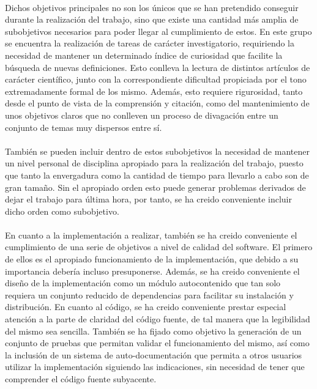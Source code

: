 \documentclass{subfiles}
\begin{document}
      \paragraph{}
      Dichos objetivos principales no son los únicos que se han pretendido conseguir durante la realización del trabajo, sino que existe una cantidad más amplia de subobjetivos necesarios para poder llegar al cumplimiento de estos. En este grupo se encuentra la realización de tareas de carácter investigatorio, requiriendo la necesidad de mantener un determinado índice de curiosidad que facilite la búsqueda de nuevas definiciones. Esto conlleva la lectura de distintos artículos de carácter científico, junto con la correspondiente dificultad propiciada por el tono extremadamente formal de los mismo. Además, esto requiere rigurosidad, tanto desde el punto de vista de la comprensión y citación, como del mantenimiento de unos objetivos claros que no conlleven un proceso de divagación entre un conjunto de temas muy dispersos entre sí.

      \paragraph{}
      También se pueden incluir dentro de estos subobjetivos la necesidad de mantener un nivel personal de disciplina apropiado para la realización del trabajo, puesto que tanto la envergadura como la cantidad de tiempo para llevarlo a cabo son de gran tamaño. Sin el apropiado orden esto puede generar problemas derivados de dejar el trabajo para última hora, por tanto, se ha creido conveniente incluir dicho orden como subobjetivo.

      \paragraph{}
      En cuanto a la implementación a realizar, también se ha creido conveniente el cumplimiento de una serie de objetivos a nivel de calidad del software. El primero de ellos es el apropiado funcionamiento de la implementación, que debido a su importancia debería incluso presuponerse. Además, se ha creido conveniente el diseño de la implementación como un módulo autocontenido que tan solo requiera un conjunto reducido de dependencias para facilitar su instalación y distribución. En cuanto al código, se ha creido conveniente prestar especial atención a la parte de claridad del código fuente, de tal manera que la legibilidad del mismo sea sencilla. También se ha fijado como objetivo la generación de un conjunto de pruebas que permitan validar el funcionamiento del mismo, así como la inclusión de un sistema de auto-documentación que permita a otros usuarios utilizar la implementación siguiendo las indicaciones, sin necesidad de tener que comprender el código fuente subyacente.
\end{document}
